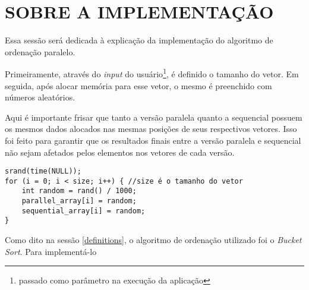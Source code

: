 \section{\normalsize SOBRE A IMPLEMENTAÇÃO}
	Essa sessão será dedicada à explicação da implementação do algoritmo de ordenação paralelo.
	
	Primeiramente, através do \textit{input} do usuário\footnote{passado como parâmetro na execução da aplicação}, é definido o tamanho do vetor. Em seguida, após alocar memória para esse vetor, o mesmo é preenchido com números aleatórios. 
	
	Aqui é importante frisar que tanto a versão paralela quanto a sequencial possuem os mesmos dados alocados nas mesmas posições de seus respectivos vetores. Isso foi feito para garantir que os resultados finais entre a versão paralela e sequencial não sejam afetados pelos elementos nos vetores de cada versão.
	
	\begin{lstlisting}[style=C]
srand(time(NULL));
for (i = 0; i < size; i++) { //size é o tamanho do vetor
	int random = rand() / 1000;
	parallel_array[i] = random;
	sequential_array[i] = random;
}
	\end{lstlisting}
	
	 
	Como dito na sessão \ref{definitions}, o algoritmo de ordenação utilizado foi o \textit{Bucket Sort}. Para implementá-lo 